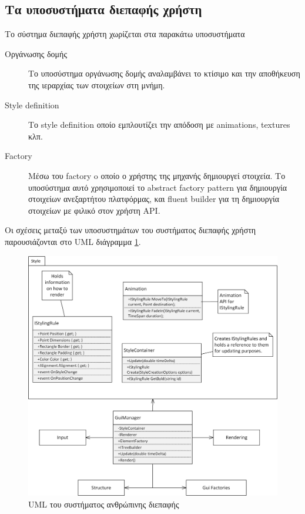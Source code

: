\subsection{Τα υποσυστήματα διεπαφής χρήστη}	
Το σύστημα διεπαφής χρήστη χωρίζεται στα παρακάτω υποσυστήματα
	\begin{description}
		\item [Οργάνωσης δομής] Το υποσύστημα οργάνωσης δομής αναλαμβάνει το κτίσιμο και την αποθήκευση της ιεραρχίας των στοιχείων στη μνήμη.
		\item [Style definition] Το style definition οποίο εμπλουτίζει την απόδοση με animations, textures κλπ.
		\item [Factory] Μέσω του factory o οποίο ο χρήστης της μηχανής δημιουργεί στοιχεία. Το υποσύστημα αυτό χρησιμοποιεί το abstract factory pattern \cite{Gamma:1995:DPE:186897} για δημιουργία στοιχείων ανεξαρτήτου πλατφόρμας, και fluent builder για τη δημιουργία στοιχείων με φιλικό στον χρήστη \gls{API}.
	\end{description}
	
Οι σχέσεις μεταξύ των υποσυστημάτων του συστήματος διεπαφής χρήστη παρουσιάζονται στο \gls{UML} διάγραμμα \ref{fig:ui_system}.
	\begin{figure}[h!]
		\centering
		\includegraphics[width=165mm]{Images/gui_system}
		\caption{UML του συστήματος ανθρώπινης διεπαφής}
		\label{fig:ui_system}
	\end{figure}	
	

